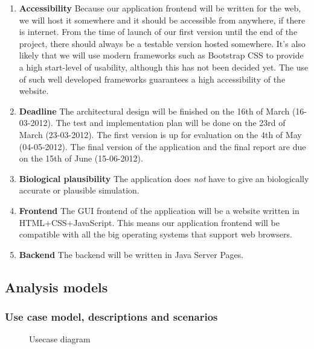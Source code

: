 \documentclass[a4paper]{article}
\begin{document}
\begin{enumerate}
\item \textbf{Accessibility} Because our application frontend will be written for the web, we will host it somewhere and it should be accessible from anywhere, if there is internet. From the time of launch of our first version until the end of the project, there should always be a testable version hosted somewhere. It's also likely that we will use modern frameworks such as Bootstrap CSS to provide a high start-level of usability, although this has not been decided yet. The use of such well developed frameworks guarantees a high accessibility of the website.

\item \textbf{Deadline} The architectural design will be finished on the 16th of March (16-03-2012). The test and implementation plan will be done on the 23rd of March (23-03-2012). The first version is up for evaluation on the 4th of May (04-05-2012). The final version of the application and the final report are due on the 15th of June (15-06-2012).
\item \textbf{Biological plausibility} The application does \textit{not} have to give an biologically accurate or plausible simulation.

\item \textbf{Frontend} The GUI frontend of the application will be a website written in HTML+CSS+JavaScript. This means our application frontend will be compatible with all the big operating systems that support web browsers.\item \textbf{Backend} The backend will be written in Java Server Pages.
 
\end{enumerate}
\pagebreak
\subsection{Analysis models}
\subsubsection{Use case model, descriptions and scenarios}
\begin{figure}[h!]
	\caption{Usecase diagram}
	\centering
\end{figure}
\end{document}

